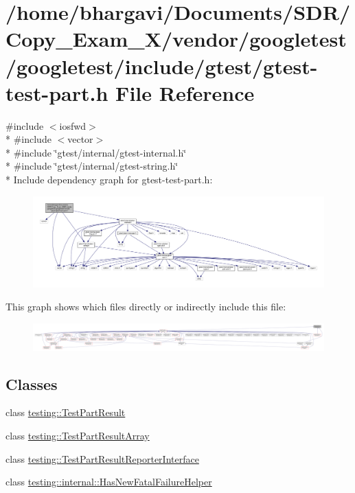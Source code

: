\hypertarget{gtest-test-part_8h}{}\section{/home/bhargavi/\+Documents/\+S\+D\+R/\+Copy\+\_\+\+Exam\+\_\+X/vendor/googletest/googletest/include/gtest/gtest-\/test-\/part.h File Reference}
\label{gtest-test-part_8h}
{\ttfamily \#include $<$iosfwd$>$}\\*
{\ttfamily \#include $<$vector$>$}\\*
{\ttfamily \#include \char`\"{}gtest/internal/gtest-\/internal.\+h\char`\"{}}\\*
{\ttfamily \#include \char`\"{}gtest/internal/gtest-\/string.\+h\char`\"{}}\\*
Include dependency graph for gtest-\/test-\/part.h\+:
\nopagebreak
\begin{figure}[H]
\begin{center}
\leavevmode
\includegraphics[width=350pt]{gtest-test-part_8h__incl}
\end{center}
\end{figure}
This graph shows which files directly or indirectly include this file\+:
\nopagebreak
\begin{figure}[H]
\begin{center}
\leavevmode
\includegraphics[width=350pt]{gtest-test-part_8h__dep__incl}
\end{center}
\end{figure}
\subsection*{Classes}
\begin{DoxyCompactItemize}
\item 
class \hyperlink{classtesting_1_1_test_part_result}{testing\+::\+Test\+Part\+Result}
\item 
class \hyperlink{classtesting_1_1_test_part_result_array}{testing\+::\+Test\+Part\+Result\+Array}
\item 
class \hyperlink{classtesting_1_1_test_part_result_reporter_interface}{testing\+::\+Test\+Part\+Result\+Reporter\+Interface}
\item 
class \hyperlink{classtesting_1_1internal_1_1_has_new_fatal_failure_helper}{testing\+::internal\+::\+Has\+New\+Fatal\+Failure\+Helper}
\end{DoxyCompactItemize}

